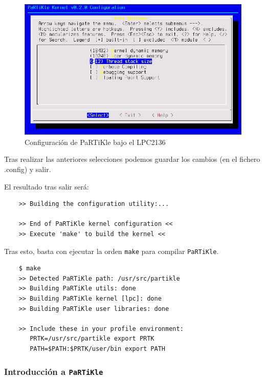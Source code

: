 \documentclass[10pt,a4paper]{article}
\newcommand{\partikle}[0]{\texttt{PaRTiKle}}
\begin{document}
	\begin{figure}[htbp]
	\begin{center}
	\includegraphics[width = 1\columnwidth]{img/lpc-confscr}
	\end{center}
	
	\caption{Configuración de PaRTiKle bajo el LPC2136}
	\label{fig:lpc-confscr}
	\end{figure}

	Tras realizar las anteriores selecciones podemos guardar los cambios (en el fichero .config) y salir.

	El resultado tras salir será:

	\begin{verbatim}
	>> Building the configuration utility:...

	>> End of PaRTiKle kernel configuration <<
	>> Execute 'make' to build the kernel <<
	\end{verbatim}

	Tras esto, basta con ejecutar la orden \texttt{make} para compilar \partikle{}.

	\begin{verbatim}
	$ make
	>> Detected PaRTiKle path: /usr/src/partikle
	>> Building PaRTiKle utils: done                 
	>> Building PaRTiKle kernel [lpc]: done                                    
	>> Building PaRTiKle user libraries: done                  
	
	>> Include these in your profile environment:
	   PRTK=/usr/src/partikle export PRTK
	   PATH=$PATH:$PRTK/user/bin export PATH
	\end{verbatim}
	
	\subsubsection{Introducción a \partikle{}}
	
\end{document}
